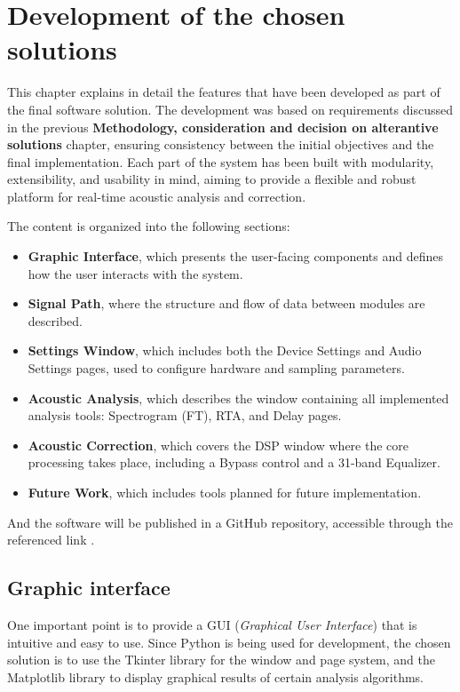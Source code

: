 \chapter{Development of the chosen solutions}


This chapter explains in detail the features that have been developed as part of the final software solution. The development was based on requirements discussed in the previous \textbf{Methodology, consideration and decision on alterantive solutions} chapter, ensuring consistency between the initial objectives and the final implementation. Each part of the system has been built with modularity, extensibility, and usability in mind, aiming to provide a flexible and robust platform for real-time acoustic analysis and correction.

The content is organized into the following sections:

\begin{itemize}
	\item \textbf{Graphic Interface}, which presents the user-facing components and defines how the user interacts with the system.
	\item \textbf{Signal Path}, where the structure and flow of data between modules are described.
	\item \textbf{Settings Window}, which includes both the Device Settings and Audio Settings pages, used to configure hardware and sampling parameters.
	\item \textbf{Acoustic Analysis}, which describes the window containing all implemented analysis tools: Spectrogram (FT), RTA, and Delay pages.
	\item \textbf{Acoustic Correction}, which covers the DSP window where the core processing takes place, including a Bypass control and a 31-band Equalizer.
	\item \textbf{Future Work}, which includes tools planned for future implementation.
\end{itemize}

And the software will be published in a GitHub repository, accessible through the referenced link \cite{git}.

\section{Graphic interface}

One important point is to provide a GUI (\textit{Graphical User Interface}) that is intuitive and easy to use. Since Python is being used for development, the chosen solution is to use the Tkinter\cite{Tkinter} library for the window and page system, and the Matplotlib\cite{Matplotlib} library to display graphical results of certain analysis algorithms.

